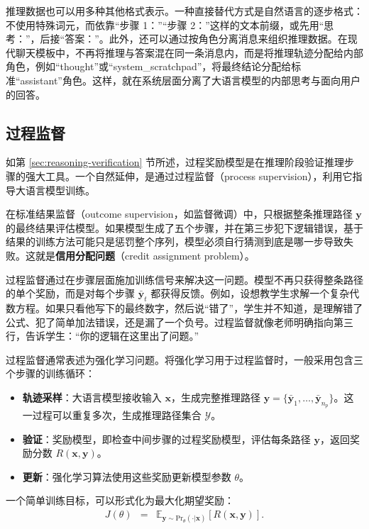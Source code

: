推理数据也可以用多种其他格式表示。一种直接替代方式是自然语言的逐步格式：不使用特殊词元，而依靠“步骤 1：”“步骤 2：”这样的文本前缀，或先用“思考：”，后接“答案：”。此外，还可以通过按角色分离消息来组织推理数据。在现代聊天模板中，不再将推理与答案混在同一条消息内，而是将推理轨迹分配给内部角色，例如“thought”或“system\_scratchpad”，将最终结论分配给标准“assistant”角色。这样，就在系统层面分离了大语言模型的内部思考与面向用户的回答。

\subsection{过程监督}

如第 \ref{sec:reasoning-verification} 节所述，过程奖励模型是在推理阶段验证推理步骤的强大工具。一个自然延伸，是通过过程监督（process supervision），利用它指导大语言模型训练。

在标准结果监督（outcome supervision，如监督微调）中，只根据整条推理路径 $\mathbf{y}$ 的最终结果评估模型。如果模型生成了五个步骤，并在第三步犯下逻辑错误，基于结果的训练方法可能只是惩罚整个序列，模型必须自行猜测到底是哪一步导致失败。这就是\textbf{信用分配问题}（credit assignment problem）\cite{minsky:1961steps,sutton:1984temporal}。

过程监督通过在步骤层面施加训练信号来解决这一问题。模型不再只获得整条路径的单个奖励，而是对每个步骤 $\bar{\mathbf{y}}_t$ 都获得反馈。例如，设想教学生求解一个复杂代数方程。如果只看他写下的最终数字，然后说“错了”，学生并不知道，是理解错了公式、犯了简单加法错误，还是漏了一个负号。过程监督就像老师明确指向第三行，告诉学生：“你的逻辑在这里出了问题。”

过程监督通常表述为强化学习问题。将强化学习用于过程监督时，一般采用包含三个步骤的训练循环：

\begin{itemize}
\item \textbf{轨迹采样}：大语言模型接收输入 $\mathbf{x}$，生成完整推理路径 $\mathbf{y} = \{\bar{\mathbf{y}}_1, \dots, \bar{\mathbf{y}}_{n_p}\}$。这一过程可以重复多次，生成推理路径集合 $\mathcal{Y}$。
\item \textbf{验证}：奖励模型，即检查中间步骤的过程奖励模型，评估每条路径 $\mathbf{y}$，返回奖励分数 $R(\mathbf{x}, \mathbf{y})$。
\item \textbf{更新}：强化学习算法使用这些奖励更新模型参数 $\theta$。
\end{itemize}

一个简单训练目标，可以形式化为最大化期望奖励：
\begin{eqnarray}
J(\theta) & = & \mathbb{E}_{\mathbf{y} \sim \mathrm{Pr}_{\theta}(\cdot|\mathbf{x})} \left[ R(\mathbf{x}, \mathbf{y}) \right]. \label{eq:simple-rl-objective-for-reasoning}
\end{eqnarray}

